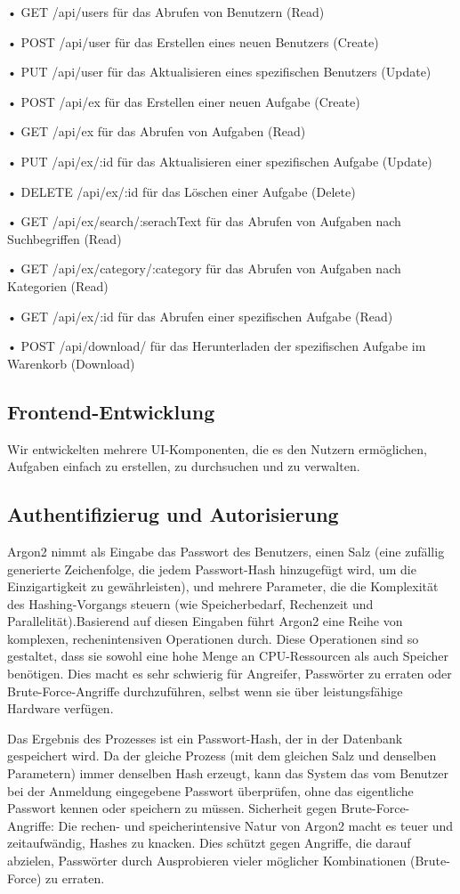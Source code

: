 \documentclass[12pt,a4paper]{article} %
\begin{document}
•	GET /api/users	für das Abrufen von Benutzern (Read)

•	POST /api/user	für das Erstellen eines neuen Benutzers (Create)

•	PUT /api/user	für das Aktualisieren eines spezifischen Benutzers (Update)

•	POST /api/ex	für das Erstellen einer neuen Aufgabe (Create)

•	GET /api/ex	für das Abrufen von Aufgaben (Read)

•	PUT /api/ex/:id	für das Aktualisieren einer spezifischen Aufgabe (Update)

•	DELETE /api/ex/:id 	für das Löschen einer Aufgabe (Delete)

•	GET /api/ex/search/:serachText	für das Abrufen von Aufgaben nach Suchbegriffen (Read)

•	GET /api/ex/category/:category	für das Abrufen von Aufgaben nach Kategorien (Read)

•	GET /api/ex/:id	für das Abrufen einer spezifischen Aufgabe (Read)

•	POST /api/download/ 	für das Herunterladen der spezifischen Aufgabe im Warenkorb (Download)


\subsection{Frontend-Entwicklung}
Wir entwickelten mehrere UI-Komponenten, die es den Nutzern ermöglichen, Aufgaben einfach zu erstellen, zu durchsuchen und zu verwalten.
\subsection{Authentifizierug und Autorisierung}
Argon2 nimmt als Eingabe das Passwort des Benutzers, einen Salz (eine zufällig generierte Zeichenfolge, die jedem Passwort-Hash hinzugefügt wird, um die Einzigartigkeit zu gewährleisten), und mehrere Parameter, die die Komplexität des Hashing-Vorgangs steuern (wie Speicherbedarf, Rechenzeit und Parallelität).Basierend auf diesen Eingaben führt Argon2 eine Reihe von komplexen, rechenintensiven Operationen durch. Diese Operationen sind so gestaltet, dass sie sowohl eine hohe Menge an CPU-Ressourcen als auch Speicher benötigen. Dies macht es sehr schwierig für Angreifer, Passwörter zu erraten oder Brute-Force-Angriffe durchzuführen, selbst wenn sie über leistungsfähige Hardware verfügen.

Das Ergebnis des Prozesses ist ein Passwort-Hash, der in der Datenbank gespeichert wird. Da der gleiche Prozess (mit dem gleichen Salz und denselben Parametern) immer denselben Hash erzeugt, kann das System das vom Benutzer bei der Anmeldung eingegebene Passwort überprüfen, ohne das eigentliche Passwort kennen oder speichern zu müssen. Sicherheit gegen Brute-Force-Angriffe: Die rechen- und speicherintensive Natur von Argon2 macht es teuer und zeitaufwändig, Hashes zu knacken. Dies schützt gegen Angriffe, die darauf abzielen, Passwörter durch Ausprobieren vieler möglicher Kombinationen (Brute-Force) zu erraten.
\end{document}
